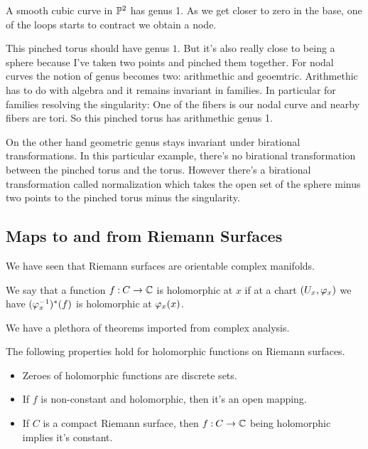 \documentclass[12pt]{memoir}
\begin{document}
\begin{Ex}
A smooth cubic curve in $\mathbb{P}^2$ has genus 1. As we get closer to zero in the base, one of the loops starts to contract we obtain a node.\par
This pinched torus should have genus $1$. But it's also really close to being a sphere because I've taken two points and pinched them together. For nodal curves the notion of genus becomes two: arithmethic and geoemtric. Arithmethic has to do with algebra and it remains invariant in families. In particular for families resolving the singularity: One of the fibers is our nodal curve and nearby fibers are tori. So this pinched torus has arithmethic genus 1.\par
On the other hand geometric genus stays invariant under birational transformations. In this particular example, there's no birational transformation between the pinched torus and the torus. However there's a birational transformation called normalization which takes the open set of the sphere minus two points to the pinched torus minus the singularity.
\end{Ex}

\subsection{Maps to and from Riemann Surfaces}

We have seen that Riemann surfaces are orientable complex manifolds. 

\begin{Def}
We say that a function $f\mathbin{:} C\to\mathbb{C}$ is holomorphic at $x$ if at a chart $(U_x,\varphi_x)$ we have $(\varphi_x^{-1})^\ast(f)$ is holomorphic at $\varphi_x(x)$.
\end{Def}

We have a plethora of theorems imported from complex analysis. 

\begin{Prop}
    The following properties hold for holomorphic functions on Riemann surfaces.
\begin{itemize}
    \item Zeroes of holomorphic functions are discrete sets.
    \item If $f$ is non-constant and holomorphic, then it's an open mapping. 
    \item If $C$ is a compact Riemann surface, then $f\mathbin{:} C\to\mathbb{C}$ being holomorphic implies it's constant. 
\end{itemize}
\end{Prop}
\end{document}
